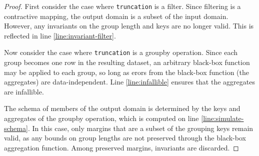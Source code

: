 \documentclass{article}
\begin{document}
\begin{proof}
    First consider the case where \texttt{truncation} is a filter.
    Since filtering is a contractive mapping,
    the output domain is a subset of the input domain. 
    However, any invariants on the group length and keys are no longer valid. 
    This is reflected in line \ref{line:invariant-filter}.

    Now consider the case where \texttt{truncation} is a groupby operation.
    Since each group becomes one row in the resulting dataset, 
    an arbitrary black-box function may be applied to each group, 
    so long as erors from the black-box function (the aggregates) are data-independent.
    Line \ref{line:infallible} ensures that the aggregates are infallible.

    The schema of members of the output domain is determined by the keys and aggregates of the groupby operation,
    which is computed on line \ref{line:simulate-schema}.
    In this case, only margins that are a subset of the grouping keys remain valid,
    as any bounds on group lengths are not preserved through the black-box aggregation function.
    Among preserved margins, invariants are discarded.
\end{proof}
\end{document}

